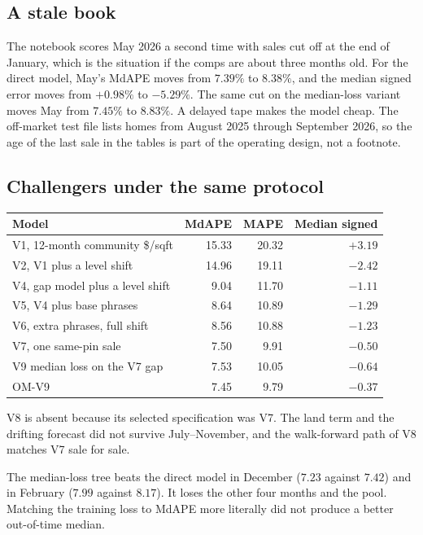 \documentclass[11pt]{article}
\newcommand{\modelid}{OM-V9}
\begin{document}
\subsection{A stale book}
\label{sec:stale}

The notebook scores May 2026 a second time with sales cut off at the end of January, which is the situation if the comps are about three months old. For the direct model, May's MdAPE moves from \(7.39\%\) to \(8.38\%\), and the median signed error moves from \(+0.98\%\) to \(-5.29\%\). The same cut on the median-loss variant moves May from \(7.45\%\) to \(8.83\%\). A delayed tape makes the model cheap. The off-market test file lists homes from August 2025 through September 2026, so the age of the last sale in the tables is part of the operating design, not a footnote.

\subsection{Challengers under the same protocol}
\label{sec:challengers}

\begin{center}
\begin{tabular}{lrrr}
\toprule
Model & MdAPE & MAPE & Median signed \\
\midrule
V1, 12-month community \$/sqft & 15.33 & 20.32 & \(+3.19\) \\
V2, V1 plus a level shift & 14.96 & 19.11 & \(-2.42\) \\
V4, gap model plus a level shift & 9.04 & 11.70 & \(-1.11\) \\
V5, V4 plus base phrases & 8.64 & 10.89 & \(-1.29\) \\
V6, extra phrases, full shift & 8.56 & 10.88 & \(-1.23\) \\
V7, one same-pin sale & 7.50 & 9.91 & \(-0.50\) \\
V9 median loss on the V7 gap & 7.53 & 10.05 & \(-0.64\) \\
\modelid{} & 7.45 & 9.79 & \(-0.37\) \\
\bottomrule
\end{tabular}
\end{center}

V8 is absent because its selected specification was V7. The land term and the drifting forecast did not survive July--November, and the walk-forward path of V8 matches V7 sale for sale.

The median-loss tree beats the direct model in December (\(7.23\) against \(7.42\)) and in February (\(7.99\) against \(8.17\)). It loses the other four months and the pool. Matching the training loss to MdAPE more literally did not produce a better out-of-time median.
\end{document}
